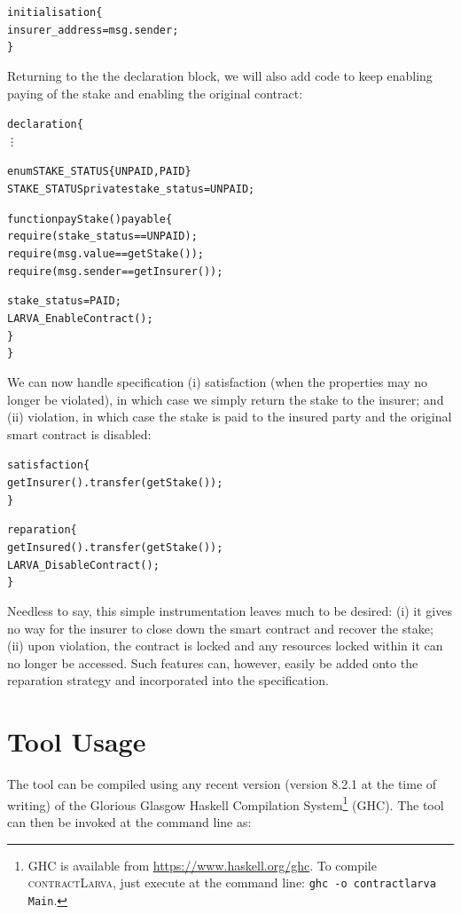 \documentclass{article}
\newcommand{\contractlarva}{\textsc{contractLarva}\xspace}
\begin{document}
    \small\begin{alltt}
    initialisation \{
      insurer\_address = msg.sender;
    \}
    \end{alltt}\normalsize

    Returning to the the declaration block, we will also add code to keep enabling paying of the stake and enabling the original contract:
    
    \small\begin{alltt}
    declaration \{
      \vdots
      
      enum STAKE\_STATUS \{ UNPAID, PAID \}
      STAKE\_STATUS private stake\_status = UNPAID;
      
      function payStake() payable \{
        require (stake\_status == UNPAID);
        require (msg.value == getStake());
        require (msg.sender == getInsurer());
        
        stake\_status = PAID;
        LARVA\_EnableContract();
      \}
    \}
    \end{alltt}\normalsize

    We can now handle specification (i) satisfaction (when the properties may no longer be violated), in which case we simply return the stake to the insurer; and (ii) violation, in which case the stake is paid to the insured party and the original smart contract is disabled:
    
    \small\begin{alltt}
    satisfaction \{
      getInsurer().transfer(getStake());      
    \}

    reparation \{
      getInsured().transfer(getStake());
      LARVA\_DisableContract();
    \}
    \end{alltt}\normalsize
  
    Needless to say, this simple instrumentation leaves much to be desired: (i) it gives no way for the insurer to close down the smart contract and recover the stake; (ii) upon violation, the contract is locked and any resources locked within it can no longer be accessed. Such features can, however, easily be added onto the reparation strategy and incorporated into the specification.
    
  \section{Tool Usage}
  The tool can be compiled using any recent version (version 8.2.1 at the time of writing) of the Glorious Glasgow Haskell Compilation System\footnote{GHC is available from \url{https://www.haskell.org/ghc}. To compile \contractlarva, just execute at the command line: \texttt{ghc -o contractlarva Main}.} (GHC). The tool can then be invoked at the command line as:
  
\end{document}
